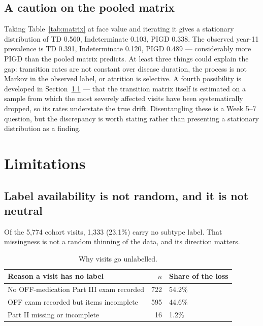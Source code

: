 \documentclass[11pt,a4paper]{article}
\begin{document}
\subsection{A caution on the pooled matrix}

Taking Table~\ref{tab:matrix} at face value and iterating it gives a stationary
distribution of TD 0.560, Indeterminate 0.103, PIGD 0.338. The observed year-11
prevalence is TD 0.391, Indeterminate 0.120, PIGD 0.489 --- considerably more
PIGD than the pooled matrix predicts. At least three things could explain the
gap: transition rates are not constant over disease duration, the process is
not Markov in the observed label, or attrition is selective. A fourth
possibility is developed in Section~\ref{sec:missingness} --- that the
transition matrix itself is estimated on a sample from which the most severely
affected visits have been systematically dropped, so its rates understate the
true drift. Disentangling these is a Week 5--7 question, but the discrepancy is
worth stating rather than presenting a stationary distribution as a finding.

\section{Limitations}

\subsection{Label availability is not random, and it is not neutral}
\label{sec:missingness}

Of the 5{,}774 cohort visits, 1{,}333 (23.1\%) carry no subtype label. That
missingness is not a random thinning of the data, and its direction matters.

\begin{table}[htbp]
\centering
\begin{tabular}{@{}lrl@{}}
\toprule
\textbf{Reason a visit has no label} & \textbf{$n$} & \textbf{Share of the loss} \\
\midrule
No OFF-medication Part III exam recorded  & 722 & 54.2\% \\
OFF exam recorded but items incomplete    & 595 & 44.6\% \\
Part II missing or incomplete             &  16 &  1.2\% \\
\bottomrule
\end{tabular}
\caption{Why visits go unlabelled.}
\end{table}
\end{document}
